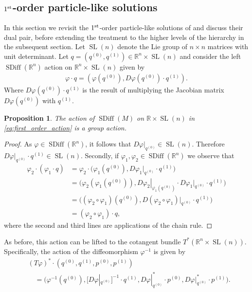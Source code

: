 \documentclass[12pt]{amsart}
\newcommand{\R}{\ensuremath{\mathbb{R}}}
\newtheorem{prop}[thm]{Proposition}
\DeclareMathOperator{\SDiff}{SDiff}
\DeclareMathOperator{\SL}{SL}
\begin{document}
\subsection{$1^{\rm st}$-order particle-like solutions}
\label{sec:first_order}
In this section we revisit the $1^{\rm st}$-order particle-like solutions of \cite{CotterHolmJacobsMeier2014} and discuss their dual pair, before extending the treatment to the higher levels of the hierarchy in the subsequent section. 
  Let $\SL(n)$ denote the Lie group of $n\times n$ matrices
  with unit determinant.
  Let $q = (q^{(0)}, q^{(1)}) \in \R^n \times \SL(n)$ and consider the left
  $\SDiff(\R^n)$ action on $\R^n \times \SL(n)$ given by
  \begin{align}
    \varphi \cdot q = (\varphi(q^{(0)} ) , D\varphi(q^{(0)} ) \cdot q^{(1)} ). \label{eq:first_order_action}
  \end{align}
  Where $D\varphi(q^{(0)} ) \cdot q^{(1)}$ is the result of multiplying
  the Jacobian matrix $D\varphi(q^{(0)} )$ with $q^{(1)}$.
  \begin{prop}
    The action of $\SDiff(M)$ on $\R \times \SL(n)$ in \eqref{eq:first_order_action} is a group action.
  \end{prop}
  \begin{proof}
    As $\varphi \in \SDiff(\R^n)$, it follows that $D\varphi |_{q^{(0)}} \in \SL(n)$.
    Therefore $D\varphi |_{q^{(0)}} \cdot q^{(1)} \in \SL(n)$.
    Secondly, if $\varphi_1,\varphi_2 \in \SDiff(\R^n)$ we observe that
    \begin{align*}
      \varphi_2 \cdot (\varphi_1 \cdot q)
      &= \varphi_2 \cdot \big(\varphi_1(q^{(0)} ) , D\varphi_1 |_{q^{(0)}} \cdot q^{(1)} \big) \\
      &= \big(\varphi_2(\varphi_1(q^{(0)} )) , \left. D\varphi_2 \right|_{\varphi_1( q^{(0)} )} \cdot D\varphi_1 |_{ q^{(0)} } \cdot q^{(1)} \big) \\
      &= \big( (\varphi_2 \circ \varphi_1)(q^{(0)} ) , D( \varphi_2 \circ \varphi_1)|_{q^{(0)} } \cdot q^{(1)} \big) \\
      &= (\varphi_2 \circ \varphi_1) \cdot q,
    \end{align*}
    where the second and third lines are applications of the chain rule.
  \end{proof}
  As before, this action can be lifted to the cotangent bundle $T^*(\R^n \times \SL(n))$.  Specifically, 
  the action of the diffeomorphism $\varphi^{-1}$ is given by
  \begin{align*}
    & (T\varphi)^* \cdot ( q^{(0)} , q^{(1)}  , p^{(0)} , p^{(1)} ) \\
    &\quad = \big( \varphi^{-1}(q^{(0)})  , [D\varphi|_{q^{(0)}}]^{-1} \cdot q^{(1)} , D\varphi|_{q^{(0)}}^* \cdot p^{(0)} , D\varphi|_{q^{(0)}}^* \cdot p^{(1)} \big).
  \end{align*}
\end{document}
